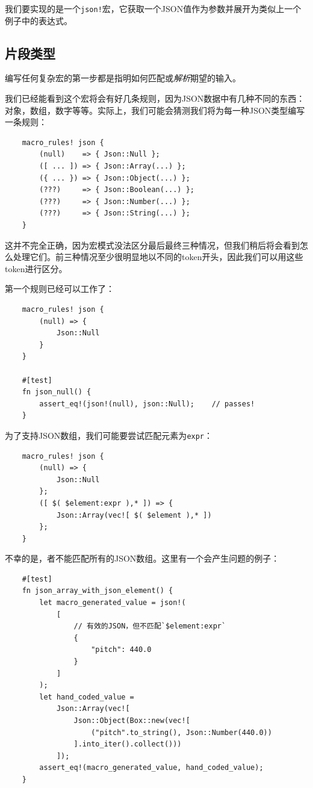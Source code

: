 我们要实现的是一个\texttt{json!}宏，它获取一个JSON值作为参数并展开为类似上一个例子中的表达式。

\subsection{片段类型}\label{FragType}
编写任何复杂宏的第一步都是指明如何匹配或\emph{解析}期望的输入。

我们已经能看到这个宏将会有好几条规则，因为JSON数据中有几种不同的东西：对象，数组，数字等等。实际上，我们可能会猜测我们将为每一种JSON类型编写一条规则：
\begin{verbatim}
    macro_rules! json {
        (null)    => { Json::Null };
        ([ ... ]) => { Json::Array(...) };
        ({ ... }) => { Json::Object(...) };
        (???)     => { Json::Boolean(...) };
        (???)     => { Json::Number(...) };
        (???)     => { Json::String(...) };
    }
\end{verbatim}

这并不完全正确，因为宏模式没法区分最后最终三种情况，但我们稍后将会看到怎么处理它们。前三种情况至少很明显地以不同的token开头，因此我们可以用这些token进行区分。

第一个规则已经可以工作了：
\begin{verbatim}
    macro_rules! json {
        (null) => {
            Json::Null
        }
    }

    #[test]
    fn json_null() {
        assert_eq!(json!(null), json::Null);    // passes!
    }
\end{verbatim}

为了支持JSON数组，我们可能要尝试匹配元素为\texttt{expr}：
\begin{verbatim}
    macro_rules! json {
        (null) => {
            Json::Null
        };
        ([ $( $element:expr ),* ]) => {
            Json::Array(vec![ $( $element ),* ])
        };
    }
\end{verbatim}

不幸的是，者不能匹配所有的JSON数组。这里有一个会产生问题的例子：
\begin{verbatim}
    #[test]
    fn json_array_with_json_element() {
        let macro_generated_value = json!(
            [
                // 有效的JSON，但不匹配`$element:expr`
                {
                    "pitch": 440.0
                }
            ]
        );
        let hand_coded_value =
            Json::Array(vec![
                Json::Object(Box::new(vec![
                    ("pitch".to_string(), Json::Number(440.0))
                ].into_iter().collect()))
            ]);
        assert_eq!(macro_generated_value, hand_coded_value);
    }
\end{verbatim}

